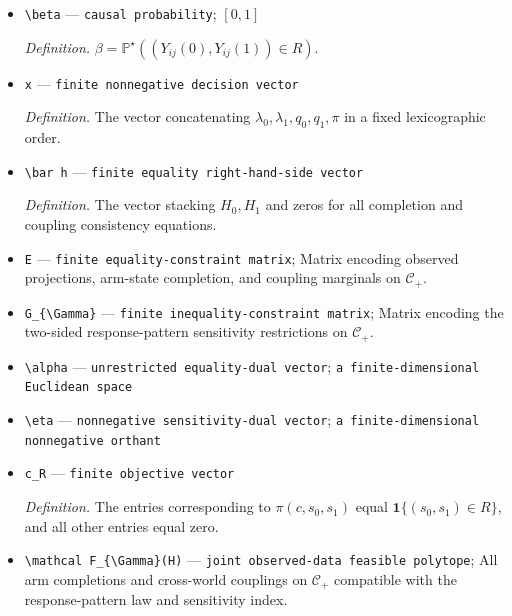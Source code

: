 \documentclass{article}
\begin{document}
\begin{itemize}
  \par\smallskip\noindent\emph{Definition.} \(R=\{(s_0,s_1):s_{1k}\ge s_{0k}\text{ for every }k,\ s_1\ne s_0\}\).
  \item \texttt{\textbackslash{}\allowbreak{}beta} --- \texttt{causal probability}; \([0,1]\)
  \par\smallskip\noindent\emph{Definition.} \(\beta=\mathbb P^{\star}((Y_{ij}(0),Y_{ij}(1))\in R)\).
  \item \texttt{x} --- \texttt{finite nonnegative decision vector}
  \par\smallskip\noindent\emph{Definition.} The vector concatenating \(\lambda_0,\lambda_1,q_0,q_1,\pi\) in a fixed lexicographic order.
  \item \texttt{\textbackslash{}\allowbreak{}bar h} --- \texttt{finite equality right-\allowbreak{}hand-\allowbreak{}side vector}
  \par\smallskip\noindent\emph{Definition.} The vector stacking \(H_0,H_1\) and zeros for all completion and coupling consistency equations.
  \item \texttt{E} --- \texttt{finite equality-\allowbreak{}constraint matrix}; Matrix encoding observed projections, arm-state completion, and coupling marginals on \(\mathcal C_{+}\).
  \item \texttt{G\_\allowbreak{}\{\textbackslash{}\allowbreak{}Gamma\}\allowbreak{}} --- \texttt{finite inequality-\allowbreak{}constraint matrix}; Matrix encoding the two-sided response-pattern sensitivity restrictions on \(\mathcal C_{+}\).
  \item \texttt{\textbackslash{}\allowbreak{}alpha} --- \texttt{unrestricted equality-\allowbreak{}dual vector}; \texttt{a finite-\allowbreak{}dimensional Euclidean space}
  \item \texttt{\textbackslash{}\allowbreak{}eta} --- \texttt{nonnegative sensitivity-\allowbreak{}dual vector}; \texttt{a finite-\allowbreak{}dimensional nonnegative orthant}
  \item \texttt{c\_\allowbreak{}R} --- \texttt{finite objective vector}
  \par\smallskip\noindent\emph{Definition.} The entries corresponding to \(\pi(c,s_0,s_1)\) equal \(\mathbf 1\{(s_0,s_1)\in R\}\), and all other entries equal zero.
  \item \texttt{\textbackslash{}\allowbreak{}mathcal F\_\allowbreak{}\{\textbackslash{}\allowbreak{}Gamma\}\allowbreak{}(H)} --- \texttt{joint observed-\allowbreak{}data feasible polytope}; All arm completions and cross-world couplings on \(\mathcal C_{+}\) compatible with the response-pattern law and sensitivity index.

\end{itemize}
\end{document}
